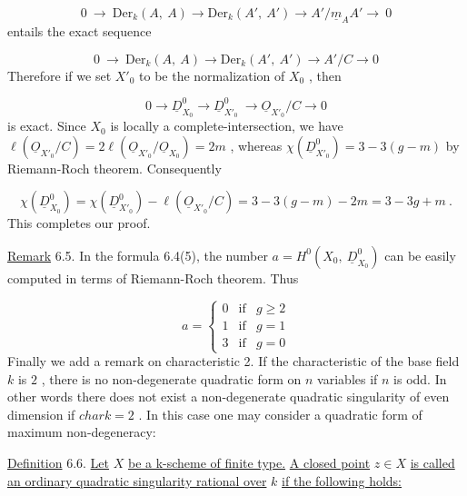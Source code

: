 \begin{equation*}
0 \ \rightarrow\ \mathrm{Der}_k(A,\ A) \rightarrow \mathrm{Der}_k(A',\ A') \rightarrow A'/\underline{m}_A A' \rightarrow\ 0
\end{equation*}
entails the exact sequence

\begin{equation*}
0 \ \rightarrow\ \mathrm{Der}_k(A,\ A) \rightarrow \mathrm{Der}_k(A',\ A') \rightarrow A'/C \rightarrow 0
\end{equation*}
Therefore if we set  $X'_0$  to be the normalization of  $X_0$ , then

\begin{equation*}
0 \rightarrow \underline{D}^0_{X_0} \rightarrow \underline{D}^0_{X'_0}\ \rightarrow \underline{O}_{X'_0}/C \rightarrow 0
\end{equation*}
is exact. Since  $X_0$  is locally a complete-intersection, we have  $\ell(\underline{O}_{X'_0}/C) = 2\ell(\underline{O}_{X'_0}/\underline{O}_{X_0}) = 2m$ , whereas  $\chi(\underline{D}^0_{X'_0}) = 3 - 3(g-m)$  by Riemann-Roch theorem. Consequently

\begin{equation*}
\chi(\underline{D}^0_{X_0}) = \chi(\underline{D}^0_{X'_0}) - \ell(\underline{O}_{X'_0}/C) = 3 - 3(g-m) - 2m = 3 - 3g + m \ .
\end{equation*}
This completes our proof.

\underline{Remark} 6.5.  In the formula 6.4(5), the number  $a = H^0(X_0,\ \underline{D}^0_{X_0})$  can be easily computed in terms of Riemann-Roch theorem. Thus

\begin{equation*}
a = \left\{ \begin{array}{lll} 0 & \text{if} & g \geq 2 \\[4pt] 1 & \text{if} & g = 1 \\[4pt] 3 & \text{if} & g = 0 \end{array} \right.
\end{equation*}
Finally we add a remark on characteristic 2. If the characteristic of the base field  $k$  is  $2$ , there is no non-degenerate quadratic form on  $n$  variables if  $n$  is odd. In other words there does not exist a non-degenerate quadratic singularity of even dimension if  $char k = 2$ . In this case one may consider a quadratic form of maximum non-degeneracy: 



\underline{Definition} 6.6.  \underline{Let}  $X$  \underline{be a k-scheme of finite type.} \underline{A closed point}  $z \in X$  \underline{is called an ordinary quadratic singularity rational over}  $k$  \underline{if the following holds:}

